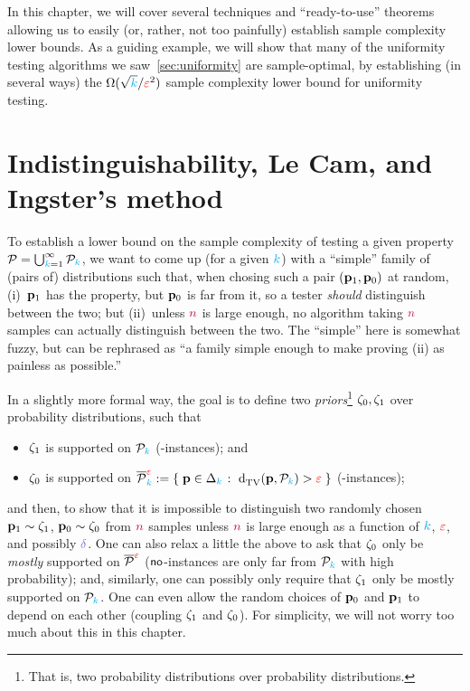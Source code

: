 In this chapter, we will cover several techniques and ``ready-to-use'' theorems allowing us to easily (or, rather, not too painfully) establish sample complexity lower bounds. As a guiding example, we will show that many of the uniformity testing algorithms we saw~\cref{sec:uniformity} are sample-optimal, by establishing (in several ways) the $\Omega(\sqrt{{\textcolor{cyan}{k}}}/\textcolor{red}{\varepsilon}^2)$ sample complexity lower bound for uniformity testing.

\section{Indistinguishability, Le Cam, and Ingster's method}
	\label{ssec:ingster}

To establish a lower bound on the sample complexity of testing a given property $\mathcal{P} = \bigcup_{{\textcolor{cyan}{k}}=1}^\infty \mathcal{P}_{\textcolor{cyan}{k}}$, we want to come up (for a given ${\textcolor{cyan}{k}}$) with a ``simple'' family of (pairs of) distributions such that, when chosing such a pair $(\mathbf{p}_1, \mathbf{p}_0)$ at random, (i)~$\mathbf{p}_1$ has the property, but $\mathbf{p}_0$ is far from it, so a tester \emph{should} distinguish between the two; but (ii)~unless ${\textcolor{purple}{n}}$ is large enough, no algorithm taking ${\textcolor{purple}{n}}$ samples can actually distinguish between the two. The ``simple'' here is somewhat fuzzy, but can be rephrased as ``a family simple enough to make proving (ii) as painless as possible.''

In a slightly more formal way, the goal is to define two \emph{priors}\footnote{That is, two probability distributions over probability distributions.} $\zeta_0,\zeta_1$ over probability distributions, such that
\begin{itemize}
	\item $\zeta_1$ is supported on $\mathcal{P}_{\textcolor{cyan}{k}}$ (\yes-instances); and
	\item $\zeta_0$ is supported on $\overline{\property}^{\dst}_\ab \eqdef \setOfSuchThat{\p\in\distribs{\ab}}{\totalvardist{\p}{\property_\ab}>\dst}$ (\no-instances);
\end{itemize}
and then, to show that it is impossible to distinguish two randomly chosen $\mathbf{p}_1\sim \zeta_1$, $\mathbf{p}_0\sim \zeta_0$ from ${\textcolor{purple}{n}}$ samples unless ${\textcolor{purple}{n}}$ is large enough as a function of ${\textcolor{cyan}{k}}$, $\textcolor{red}{\varepsilon}$, and possibly $\errprob$. One can also relax a little the above to ask that $\zeta_0$ only be \emph{mostly} supported on $\overline{\mathcal{P}}^{\textcolor{red}{\varepsilon}}$ (\ie ${\sf{}no}$-instances are only far from $\mathcal{P}_{\textcolor{cyan}{k}}$ with high probability); and, similarly, one can possibly only require that $\zeta_1$ only be mostly supported on $\mathcal{P}_{\textcolor{cyan}{k}}$. One can even allow the random choices of $\mathbf{p}_0$ and $\mathbf{p}_1$ to depend on each other (\ie coupling $\zeta_1$ and $\zeta_0$). For simplicity, we will not worry too much about this in this chapter.\medskip

